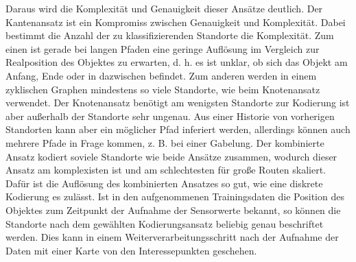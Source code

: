 \newline
Daraus wird die Komplexität und Genauigkeit dieser Ansätze deutlich.
Der Kantenansatz ist ein Kompromiss zwischen Genauigkeit und Komplexität.
Dabei bestimmt die Anzahl der zu klassifizierenden Standorte die Komplexität.
Zum einen ist gerade bei langen Pfaden eine geringe Auflösung im Vergleich zur Realposition des Objektes zu erwarten,
d. h. es ist unklar, ob sich das Objekt am Anfang, Ende oder in dazwischen befindet.
Zum anderen werden in einem zyklischen Graphen mindestens so viele Standorte, wie beim Knotenansatz verwendet.
Der Knotenansatz benötigt am wenigsten Standorte zur Kodierung ist aber außerhalb der Standorte sehr ungenau.
Aus einer Historie von vorherigen Standorten kann aber ein möglicher Pfad inferiert werden,
allerdings können auch mehrere Pfade in Frage kommen, z. B. bei einer Gabelung.
Der kombinierte Ansatz kodiert soviele Standorte wie beide Ansätze zusammen,
wodurch dieser Ansatz am komplexisten ist und am schlechtesten für große Routen skaliert.
Dafür ist die Auflösung des kombinierten Ansatzes so gut, wie eine diskrete Kodierung es zulässt.
\newline
\newline
Ist in den aufgenommenen Trainingsdaten die Position des Objektes zum Zeitpunkt der Aufnahme der Sensorwerte bekannt,
so können die Standorte nach dem gewählten Kodierungsansatz beliebig genau beschriftet werden.
Dies kann in einem Weiterverarbeitungsschritt nach der Aufnahme der Daten mit einer Karte von den Interessepunkten geschehen.